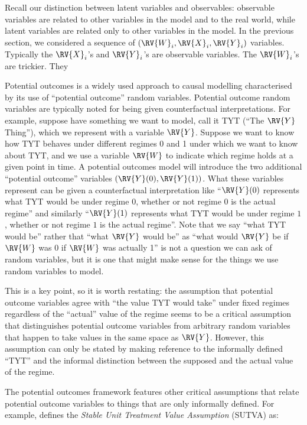 
Recall our distinction between latent variables and observables: observable variables are related to other variables in the model and to the real world, while latent variables are related only to other variables in the model. In the previous section, we considered a sequence of $(\RV{W}_i, \RV{X}_i, \RV{Y}_i)$ variables. Typically the $\RV{X}_i$'s and $\RV{Y}_i$'s are observable variables. The $\RV{W}_i$'s are trickier. They 

Potential outcomes is a widely used approach to causal modelling characterised by its use of ``potential outcome'' random variables. Potential outcome random variables are typically noted for being given counterfactual interpretations. For example, suppose have something we want to model, call it TYT (``The $\RV{Y}$ Thing''), which we represent with a variable $\RV{Y}$. Suppose we want to know how TYT behaves under different regimes 0 and 1 under which we want to know about TYT, and we use a variable $\RV{W}$ to indicate which regime holds at a given point in time. A potential outcomes model will introduce the two additional ``potential outcome'' variables $(\RV{Y}(0), \RV{Y}(1))$. What these variables represent can be given a counterfactual interpretation like ``$\RV{Y}(0)$ represents what TYT would be under regime $0$, whether or not regime $0$ is the actual regime'' and similarly ``$\RV{Y}(1)$ represents what TYT would be under regime $1$, whether or not regime $1$ is the actual regime''. Note that we say ``what TYT would be'' rather that ``what $\RV{Y}$ would be'' as ``what would $\RV{Y}$ be if $\RV{W}$ was 0 if $\RV{W}$ was actually 1'' is not a question we can ask of random variables, but it is one that might make sense for the things we use random variables to model.

This is a key point, so it is worth restating: the assumption that potential outcome variables agree with ``the value TYT would take'' under fixed regimes regardless of the ``actual'' value of the regime seems to be a critical assumption that distinguishes potential outcome variables from arbitrary random variables that happen to take values in the same space as $\RV{Y}$. However, this assumption can only be stated by making reference to the informally defined ``TYT'' and the informal distinction between the supposed and the actual value of the regime.

The potential outcomes framework features other critical assumptions that relate potential outcome variables to things that are only informally defined. For example, \citet{rubin_causal_2005} defines the \emph{Stable Unit Treatment Value Assumption} (SUTVA) as:

